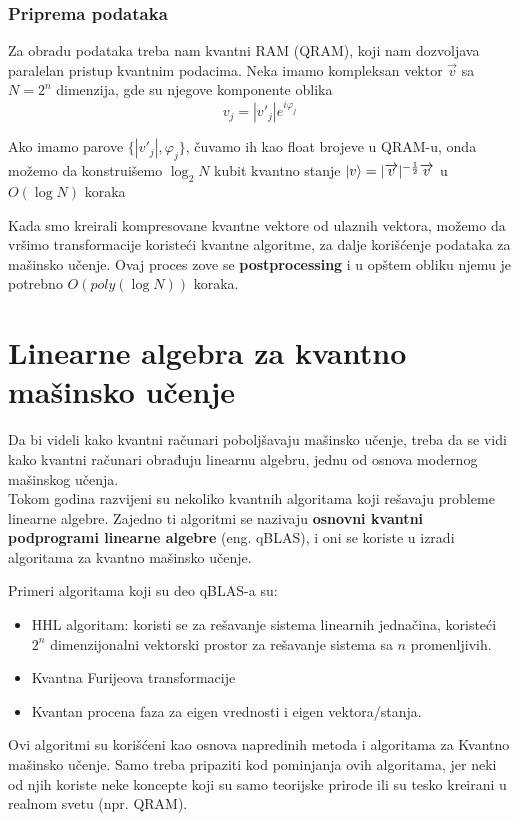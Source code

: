 \documentclass[12pt, letterpaper, oneside]{article}
\begin{document}
\subsubsection{Priprema podataka}
Za obradu podataka treba nam kvantni RAM (QRAM), koji nam dozvoljava paralelan pristup kvantnim podacima.
Neka imamo kompleksan vektor $\overrightarrow{v}$ sa $N=2^n$ dimenzija, gde su njegove komponente oblika 
\[
    v_j = |v'_j|e^{i\varphi_j}
\]

Ako imamo parove $\{|v'_j|,\varphi_j\}$, čuvamo ih kao float brojeve u QRAM-u, onda možemo da konstruišemo
$\log_{2}N$ kubit kvantno stanje $\ket{v} = |\overrightarrow{v}|^{-\frac{1}{2}}\overrightarrow{v}$ u $O(\log N)$ koraka

Kada smo kreirali kompresovane kvantne vektore od ulaznih vektora, možemo da vršimo transformacije koristeći kvantne algoritme, za dalje korišćenje podataka za mašinsko učenje.
Ovaj proces zove se \textbf{postprocessing} i u opštem obliku njemu je potrebno $O(poly(\log{}N))$ koraka. \cite{lloyd2013quantum}


\section{Linearne algebra za kvantno mašinsko učenje}
Da bi videli kako kvantni računari poboljšavaju mašinsko učenje, treba da se vidi kako kvantni računari obrađuju linearnu algebru, jednu od osnova modernog mašinskog učenja. \\
Tokom godina razvijeni su nekoliko kvantnih algoritama koji rešavaju probleme linearne algebre.
Zajedno ti algoritmi se nazivaju \textbf{osnovni kvantni podprogrami linearne algebre} (eng. qBLAS), i oni se koriste u izradi algoritama za kvantno mašinsko učenje.

Primeri algoritama koji su deo qBLAS-a su: 
\begin{itemize}
    \item HHL algoritam: koristi se za rešavanje sistema linearnih jednačina, koristeći $2^n$ dimenzijonalni vektorski prostor
        za rešavanje sistema sa $n$ promenljivih. \cite{Quantum_machine_learning}
    \item Kvantna Furijeova transformacije \cite{Classical&quantum_info_Fourie_Phase}
    \item Kvantan procena faza za eigen vrednosti i eigen vektora/stanja. \cite{Classical&quantum_info_Fourie_Phase}
\end{itemize}
Ovi algoritmi su korišćeni kao osnova napredinih metoda i algoritama za Kvantno mašinsko učenje.
Samo treba pripaziti kod pominjanja ovih algoritama, jer neki od njih koriste neke koncepte koji su samo teorijske prirode ili su tesko kreirani u realnom svetu (npr. QRAM).
\end{document}
